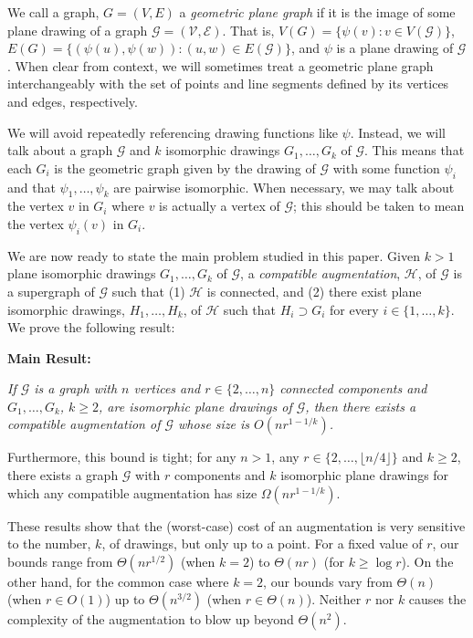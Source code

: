 \documentclass[11pt]{patmorin}
\begin{document}
We call a graph, $G=(V,E)$ a \emph{geometric plane graph} if it is
the image of some plane drawing of a graph $\mathcal{G}=(\mathcal
V, \mathcal E)$.  That is, $V(G)=\{\psi(v): v\in V(\mathcal{G})\}$,
$E(G)=\{(\psi(u),\psi(w)) : (u,w)\in E(\mathcal G)\}$, and $\psi$ is a plane
drawing of $\mathcal G$.  When clear from context, we will sometimes
treat a geometric plane graph interchangeably with the set of points
and line segments defined by its vertices and edges, respectively.

We will avoid repeatedly referencing drawing
functions like $\psi$.  Instead, we will talk about a graph $\mathcal{G}$
and $k$ isomorphic drawings $G_1,\ldots,G_k$ of $\mathcal G$.  This
means that each $G_i$ is the geometric graph given by the drawing of
$\mathcal{G}$ with some function $\psi_i$ and that $\psi_1,\ldots,\psi_k$
are pairwise isomorphic.  When necessary, we may talk about the vertex $v$
in $G_i$ where $v$ is actually a vertex of $\mathcal{G}$; this should
be taken to mean the vertex $\psi_i(v)$ in $G_i$.  

We are now ready to state the main problem studied in this paper.
Given $k>1$ plane isomorphic drawings $G_1, \ldots, G_k$
of $\mathcal G$, a \emph{compatible augmentation}, $\mathcal H$, of
$\mathcal G$ is a supergraph of $\mathcal G$ such that (1) $\mathcal H$
is connected, and (2) there exist plane isomorphic drawings,
$H_1, \ldots, H_k$, of $\mathcal H$ such that $H_i\supset G_i$ for every
$i\in\{1,\ldots,k\}$.  We prove the following result:

\noindent\textbf{Main Result:} {\itshape If $\mathcal{G}$ is a graph
with $n$ vertices and $r\in\{2,\ldots,n\}$ connected components and
$G_1,\ldots,G_k$, $k\ge 2$, are isomorphic plane drawings of $\mathcal
G$, then there exists a compatible augmentation of $\mathcal G$
whose size is $O(nr^{1-1/k})$.

Furthermore, this bound is tight; for any $n>1$, any $r\in\{2,\ldots,\lfloor n/4\rfloor\}$ and $k\ge 2$, there exists a graph $\mathcal G$
with $r$ components and $k$ isomorphic plane drawings for which any compatible
augmentation has size $\Omega(nr^{1-1/k})$.}

These results show that the (worst-case) cost of an augmentation is very
sensitive to the number, $k$, of drawings, but only up to a point.
For a fixed value of $r$, our bounds range from $\Theta(nr^{1/2})$ (when
$k=2$) to $\Theta(nr)$ (for $k\ge \log r$).  On the other hand, for the
common case where $k=2$, our bounds vary from $\Theta(n)$ (when $r\in
O(1)$) up to $\Theta(n^{3/2})$ (when $r\in\Theta(n)$).  Neither $r$ nor $k$
causes the complexity of the augmentation to blow up beyond $\Theta(n^2)$.
\end{document}
